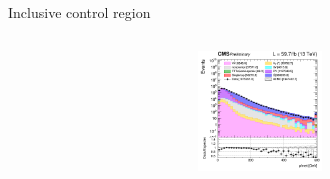 \documentclass[8pt]{beamer}
\begin{document}
\begin{frame}{Inclusive control region}
\begin{columns}
\begin{column}{0.33\textwidth}
			\begin{center}
     			\includegraphics[width=1.0\textwidth, height=90pt]{figs/2018/log_cratio_inclusiveCR_ll_METcorrected_pt.png}
    		\end{center}		
		\end{column}
\end{columns} \vfill
\end{frame}
\end{document}
